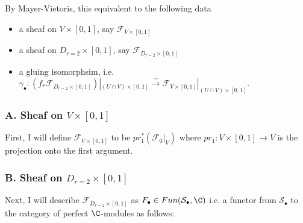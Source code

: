 By Mayer-Vietoris, this equivalent to the following data
\begin{itemize}
\item a sheaf on $V\times [0,1]$, say $\mathscr{F}_{V\times [0,1]}$

\item a sheaf on $D_{r=2}\times [0,1]$, say $\mathscr{F}_{D_{r=2}\times [0,1]}$

\item a gluing isomorphsim, i.e. $\gamma_\bullet : (f_*\mathscr{F}_{D_{r=2}\times [0,1]})|_{(U\cap V)\times [0,1]} \xrightarrow{\sim} \mathscr{F}_{V\times [0,1]}|_{(U\cap V)\times [0,1]}$.
\end{itemize}
\subsubsection{A. Sheaf on $V\times [0,1]$}
First, I will define $\mathscr{F}_{V\times [0,1]}$ to be $pr_1^*(\mathscr{F}_0|_V)$ where $pr_1 : V \times [0,1] \rightarrow V$ is the projection onto the first argument.
\subsubsection{B. Sheaf on $D_{r=2}\times [0,1]$}
Next, I will describe $\mathscr{F}_{D_{r=2}\times [0,1]}$ as $F_\bullet \in Fun(\mathcal{S}_\bullet,\C)$ i.e. a functor from $\mathcal{S}_\bullet$ to the category of perfect $\C$-modules as follows: 


